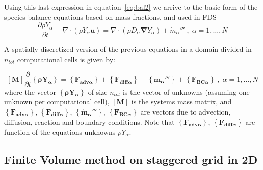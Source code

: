 Using this last expression in equation~\eqref{eq:bal2} we arrive to the basic form of the species balance equations based on mass fractions, and used in FDS
%
\begin{equation}
   \frac{\partial \rho Y_\alpha}{ \partial t} + \nabla \cdot ( \rho Y_\alpha  \mathbf{u} ) = \nabla \cdot ( \rho D_\alpha \boldsymbol{\nabla} Y_\alpha ) + \dot{m}_\alpha''' \; , \; \alpha=1,\dots,N \label{eq:bal3}
\end{equation}
%

A spatially discretized version of the previous equations in a domain divided in $n_{tot}$ computational cells is given by:

%
\begin{equation}
\left[ \mathbf{M} \right] \frac{\partial}{\partial t} \left\{ \mathbf{\rho Y_\alpha} \right\}  = \left\{ \mathbf{F_{adv \alpha}} \right\} + \left\{ \mathbf{F_{diff \alpha}} \right\} + \left\{  \mathbf{\dot{m}_\alpha'''} \right\} +  \left\{ \mathbf{F_{BC \alpha}} \right\} \; , \; \alpha=1,\dots,N \label{eq:discbal3}
\end{equation}
%
where the vector $\left\{ \mathbf{\rho Y_\alpha} \right\}$ of size $n_{tot}$ is the vector of unknowns (assuming one unknown per computational cell), $\left[ \mathbf{M} \right]$ is the systems mass matrix, and $\left\{ \mathbf{F_{adv \alpha}} \right\}$, $\left\{ \mathbf{F_{diff \alpha}} \right\}$, $\left\{  \mathbf{\dot{m}_\alpha'''} \right\}$, $\left\{ \mathbf{F_{BC \alpha}} \right\}$ are vectors due to advection, diffusion, reaction and boundary conditions. Note that  $\left\{ \mathbf{F_{adv \alpha}} \right\}$, $\left\{ \mathbf{F_{diff \alpha}} \right\}$ are function of the equations unknowns $\rho Y_\alpha$. 

\subsection{Finite Volume method on staggered grid in 2D}

